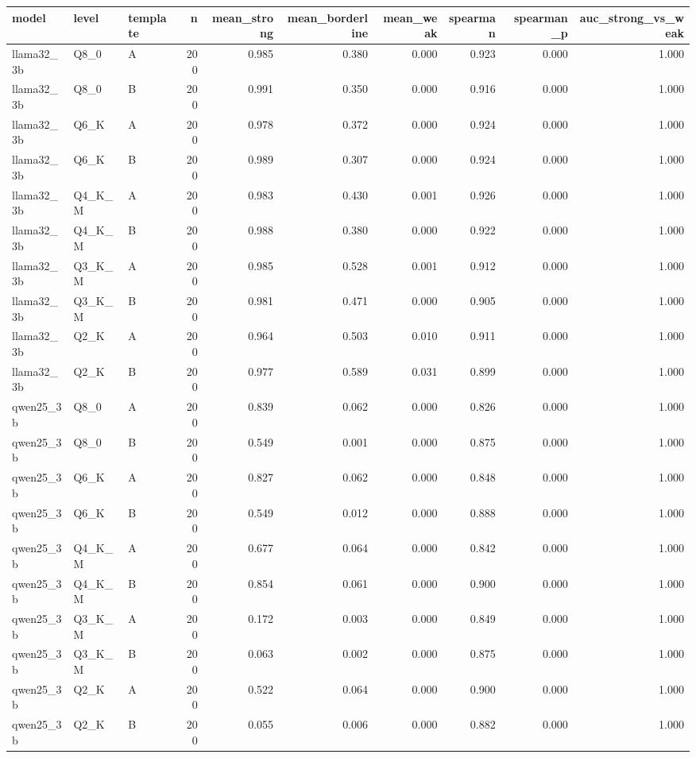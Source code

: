 \begin{tabular}{lllrrrrrrr}
\toprule
model & level & template & n & mean\_strong & mean\_borderline & mean\_weak & spearman & spearman\_p & auc\_strong\_vs\_weak \\
\midrule
llama32\_3b & Q8\_0 & A & 200 & 0.985 & 0.380 & 0.000 & 0.923 & 0.000 & 1.000 \\
llama32\_3b & Q8\_0 & B & 200 & 0.991 & 0.350 & 0.000 & 0.916 & 0.000 & 1.000 \\
llama32\_3b & Q6\_K & A & 200 & 0.978 & 0.372 & 0.000 & 0.924 & 0.000 & 1.000 \\
llama32\_3b & Q6\_K & B & 200 & 0.989 & 0.307 & 0.000 & 0.924 & 0.000 & 1.000 \\
llama32\_3b & Q4\_K\_M & A & 200 & 0.983 & 0.430 & 0.001 & 0.926 & 0.000 & 1.000 \\
llama32\_3b & Q4\_K\_M & B & 200 & 0.988 & 0.380 & 0.000 & 0.922 & 0.000 & 1.000 \\
llama32\_3b & Q3\_K\_M & A & 200 & 0.985 & 0.528 & 0.001 & 0.912 & 0.000 & 1.000 \\
llama32\_3b & Q3\_K\_M & B & 200 & 0.981 & 0.471 & 0.000 & 0.905 & 0.000 & 1.000 \\
llama32\_3b & Q2\_K & A & 200 & 0.964 & 0.503 & 0.010 & 0.911 & 0.000 & 1.000 \\
llama32\_3b & Q2\_K & B & 200 & 0.977 & 0.589 & 0.031 & 0.899 & 0.000 & 1.000 \\
qwen25\_3b & Q8\_0 & A & 200 & 0.839 & 0.062 & 0.000 & 0.826 & 0.000 & 1.000 \\
qwen25\_3b & Q8\_0 & B & 200 & 0.549 & 0.001 & 0.000 & 0.875 & 0.000 & 1.000 \\
qwen25\_3b & Q6\_K & A & 200 & 0.827 & 0.062 & 0.000 & 0.848 & 0.000 & 1.000 \\
qwen25\_3b & Q6\_K & B & 200 & 0.549 & 0.012 & 0.000 & 0.888 & 0.000 & 1.000 \\
qwen25\_3b & Q4\_K\_M & A & 200 & 0.677 & 0.064 & 0.000 & 0.842 & 0.000 & 1.000 \\
qwen25\_3b & Q4\_K\_M & B & 200 & 0.854 & 0.061 & 0.000 & 0.900 & 0.000 & 1.000 \\
qwen25\_3b & Q3\_K\_M & A & 200 & 0.172 & 0.003 & 0.000 & 0.849 & 0.000 & 1.000 \\
qwen25\_3b & Q3\_K\_M & B & 200 & 0.063 & 0.002 & 0.000 & 0.875 & 0.000 & 1.000 \\
qwen25\_3b & Q2\_K & A & 200 & 0.522 & 0.064 & 0.000 & 0.900 & 0.000 & 1.000 \\
qwen25\_3b & Q2\_K & B & 200 & 0.055 & 0.006 & 0.000 & 0.882 & 0.000 & 1.000 \\
\bottomrule
\end{tabular}
